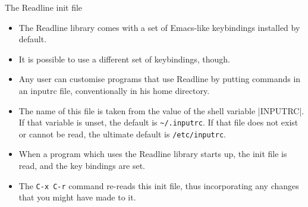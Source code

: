 \begin{frame}{The Readline init file}
    \begin{itemize}
        \item The Readline library comes with a set of Emacs-like keybindings installed by default.
        \item It is possible to use a different set of keybindings, though.
        \item Any user can customise programs that use Readline by putting commands in an inputrc file, conventionally in his home directory.
        \item The name of this file is taken from the value of the shell variable \bash|INPUTRC|.
              If that variable is unset, the default is \texttt{\textasciitilde/.inputrc}.
              If that file does not exist or cannot be read, the ultimate default is \texttt{/etc/inputrc}.
        \item When a program which uses the Readline library starts up, the init file is read, and the key bindings are set.
        \item The \texttt{C-x C-r} command re-reads this init file, thus incorporating any changes that you might have made to it.
    \end{itemize}
\end{frame}
